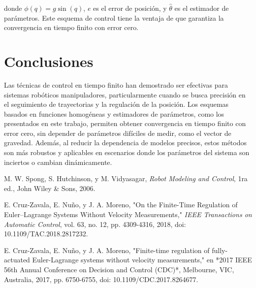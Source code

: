 \documentclass[conference]{IEEEtran}
\begin{document}
donde $\phi(q) = g \sin(q)$, $e$ es el error de posición, y $\hat{\theta}$ es el estimador de parámetros. Este esquema de control tiene la ventaja de que garantiza la convergencia en tiempo finito con error cero.


\section{Conclusiones}
Las técnicas de control en tiempo finito han demostrado ser efectivas para sistemas robóticos manipuladores, particularmente cuando se busca precisión en el seguimiento de trayectorias y la regulación de la posición. Los esquemas basados en funciones homogéneas y estimadores de parámetros, como los presentados en este trabajo, permiten obtener convergencia en tiempo finito con error cero, sin depender de parámetros difíciles de medir, como el vector de gravedad. Además, al reducir la dependencia de modelos precisos, estos métodos son más robustos y aplicables en escenarios donde los parámetros del sistema son inciertos o cambian dinámicamente.

\begin{thebibliography}{00}
	M. W. Spong, S. Hutchinson, y M. Vidyasagar, \textit{Robot Modeling and Control}, 1ra ed., John Wiley \& Sons, 2006.

	E. Cruz-Zavala, E. Nuño, y J. A. Moreno, "On the Finite-Time Regulation of Euler–Lagrange Systems Without Velocity Measurements," \textit{IEEE Transactions on Automatic Control}, vol. 63, no. 12, pp. 4309-4316, 2018, doi: 10.1109/TAC.2018.2817232.

	E. Cruz-Zavala, E. Nuño, y J. A. Moreno, "Finite-time regulation of fully-actuated Euler-Lagrange systems without velocity measurements," en *2017 IEEE 56th Annual Conference on Decision and Control (CDC)*, Melbourne, VIC, Australia, 2017, pp. 6750-6755, doi: 10.1109/CDC.2017.8264677.

\end{thebibliography}
\end{document}
